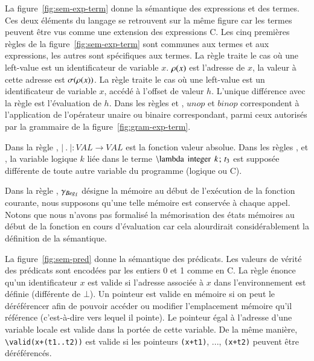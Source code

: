 La figure~\ref{fig:sem-exp-term} donne la sémantique des expressions et des
termes.
Ces deux éléments du langage se retrouvent sur la même figure car les termes
peuvent être vus comme une extension des expressions C.
Les cinq premières règles de la figure~\ref{fig:sem-exp-term} sont communes aux
termes et aux expressions, les autres sont spécifiques aux termes.
La règle  traite le cas où une left-value est un identificateur
de variable $x$.
$\rho(x)$ est l'adresse de $x$, la valeur à cette adresse est $\sigma(\rho(x))$.
La règle  traite le cas où une left-value est un identificateur
de variable $x$, accédé à l'offset de valeur $h$.
L'unique différence avec la règle  est l'évaluation de $h$.
Dans les règles  et , $\mathit{unop}$ et
$\mathit{binop}$ correspondent à l'application de l'opérateur unaire ou binaire
correspondant, parmi ceux autorisés par la grammaire de la
figure~\ref{fig:gram-exp-term}.

Dans la règle , $\lvert~.~\rvert : VAL \rightarrow VAL$ est la
fonction valeur absolue.
Dans les règles ,  et , la
variable logique $k$ liée dans le terme
$\mbox{\lstinline'\\lambda integer'}~k\semicolon~t_3$ est supposée différente de
toute autre variable du programme (logique ou C).

Dans la règle , $\gamma_{Beg_{\mathtt{f}}}$ désigne la mémoire au
début de l'exécution de la fonction courante, nous supposons
qu'une telle mémoire est conservée à chaque appel.
Notons que nous n'avons pas formalisé la mémorisation des états mémoires au
début de la fonction en cours d'évaluation car cela alourdirait considérablement
la définition de la sémantique.

La figure~\ref{fig:sem-pred} donne la sémantique des prédicats.
Les valeurs de vérité des prédicats sont encodées par les entiers 0 et 1 comme
en C.
La règle  énonce qu'un identificateur $x$ est valide
si l'adresse associée à $x$ dans l'environnement est définie (différente de
$\bot$).
Un pointeur est valide en mémoire si on peut le déréférencer afin de pouvoir
accéder ou modifier l'emplacement mémoire qu'il référence (c'est-à-dire vers
lequel il pointe).
Le pointeur égal à l'adresse d'une variable locale est valide dans la portée de
cette variable.
De la même manière, \lstinline'\valid(x+(t1..t2))' est valide si les pointeurs
\lstinline'(x+t1)', ..., \lstinline'(x+t2)' peuvent être déréférencés.

